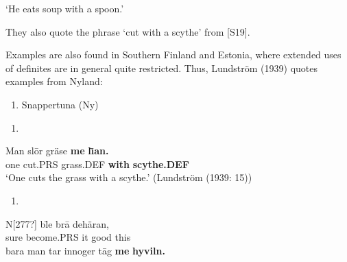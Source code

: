‘He eats soup with a spoon.’
\z


They also quote the phrase  ‘cut with a scythe’ from [S19]. 

Examples are also found in Southern Finland and Estonia, where extended uses of definites are in general quite restricted. Thus, Lundström (1939) quotes examples from Nyland:

\begin{enumerate} %
\item 
Snappertuna (Ny) 

\end{enumerate} %
\setcounter{listLFOxcviiileveli}{0}
\begin{enumerate} %
\item 
\end{enumerate} %
\ea\label{}
\gll Man  sl\=or  gräse  \textbf{me} \textbf{l}\textbf{\=\i}\textbf{an.}\\


one  cut.PRS  grass.DEF  \textbf{with} \textbf{scythe.DEF}\\ %


‘One cuts the grass with a scythe.’ (Lundström (1939: 15))
\z

\begin{enumerate} %
\item 
\end{enumerate} %
\ea\label{}
\gll N[277?]  bl\=\ir  e  br\=a  dehäran,\\


sure  become.PRS  it  good  this\\ %


\ea\label{}
\gll bara  man  tar  innoger  t\=ag  \textbf{me} \textbf{hyviln.}\\


